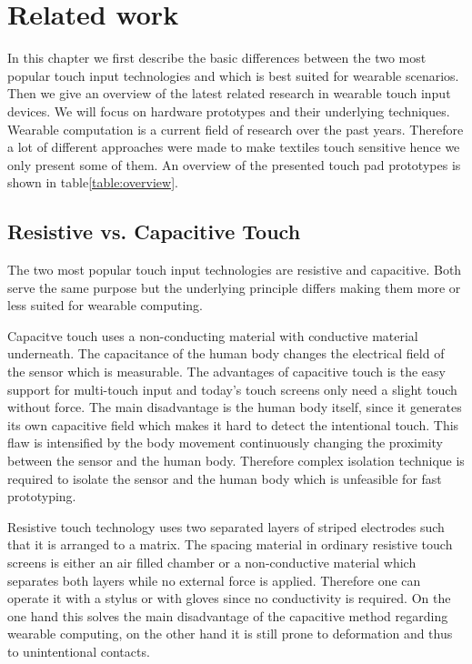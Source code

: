 %

\chapter{Related work}
\label{relatedwork}
In this chapter we first describe the basic differences between the two most popular touch input technologies and which is best suited for wearable scenarios. Then we give an overview of the latest related research in wearable touch input devices. We will  focus on hardware prototypes and their underlying techniques. Wearable computation is a current field of research over the past years. Therefore a lot of different approaches were made to make textiles touch sensitive hence we only present some of them. An overview of the presented touch pad prototypes is shown in table\ref{table:overview}.

\section{Resistive vs. Capacitive Touch}
The two most popular touch input technologies are resistive and capacitive. Both serve the same purpose but the underlying principle differs making them more or less suited for wearable computing. 

Capacitve touch uses a non-conducting material with conductive material underneath. The capacitance of the human body changes the electrical field of the sensor which is measurable. The advantages of capacitive touch is the easy support for multi-touch input and today's touch screens only need a slight touch without force. The main disadvantage is the human body itself, since  it generates its own capacitive field which makes it hard to detect the intentional touch. This flaw is intensified by the body movement continuously changing the proximity between the sensor and the human body. Therefore complex isolation technique is required to isolate the sensor and the human body which is unfeasible for fast prototyping.

Resistive touch technology uses two separated layers of striped electrodes such that it is arranged to a matrix. The spacing material in ordinary resistive touch screens is either an air filled chamber or a non-conductive material which separates both layers while no external force is applied. Therefore one can operate it with a stylus or with gloves since no conductivity is required. On the one hand this solves the main disadvantage of the capacitive method regarding wearable computing, on the other hand it is still prone to deformation and thus to unintentional contacts.

